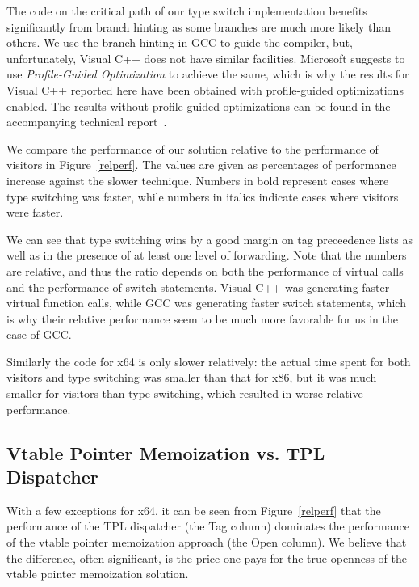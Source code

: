 \noindent
The code on the critical path of our type switch implementation benefits 
significantly from branch hinting as some branches are much more likely than 
others. We use the branch hinting in GCC to guide the compiler, but, 
unfortunately, Visual C++ does not have similar facilities. Microsoft suggests 
to use \emph{Profile-Guided Optimization} to achieve the same, which is why the 
results for Visual C++ reported here have been obtained with profile-guided 
optimizations enabled. The results without profile-guided optimizations can be 
found in the accompanying technical report~\cite[]{TR}.

We compare the performance of our solution relative to the performance of visitors in 
Figure~\ref{relperf}. The values are given as percentages of performance increase 
against the slower technique. Numbers in bold represent cases where type 
switching was faster, while numbers in italics indicate cases where visitors 
were faster.

We can see that type switching wins by a good margin on tag preceedence lists as 
well as in the presence of at least one level of forwarding. Note that the 
numbers are relative, and thus the ratio depends on both the performance of 
virtual calls and the performance of switch statements. Visual C++ was 
generating faster virtual function calls, while GCC was generating faster switch 
statements, which is why their relative performance seem to be much more 
favorable for us in the case of GCC.

Similarly the code for x64 is only slower relatively: the actual time spent for 
both visitors and type switching was smaller than that for x86, but it was much 
smaller for visitors than type switching, which resulted in worse relative 
performance.

\subsection{Vtable Pointer Memoization vs. TPL Dispatcher}
\label{sec:cmp}

With a few exceptions for x64, it can be seen from Figure~\ref{relperf} 
that the performance of the TPL dispatcher (the Tag column) dominates the 
performance of the vtable pointer memoization approach (the Open column). We believe 
that the difference, often significant, is the price one pays for the true 
openness of the vtable pointer memoization solution.

